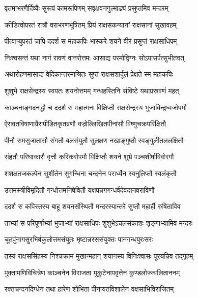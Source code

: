 \twolineshloka
{वृतमाभरणैर्दिव्यैः सुरूपं कामरूपिणम्}
{सवृक्षवनगुल्माढ्यं प्रसुप्तमिव मन्दरम्} %

\twolineshloka
{क्रीडित्वोपरतं रात्रौ वराभरणभूषितम्}
{प्रियं राक्षसकन्यानां राक्षसानां सुखावहम्} %

\twolineshloka
{पीत्वाप्युपरतं चापि ददर्श स महाकपिः}
{भास्करे शयने वीरं प्रसुप्तं राक्षसाधिपम्} %

\twolineshloka
{निःश्वसन्तं यथा नागं रावणं वानरोत्तमः}
{आसाद्य परमोद्विग्नः सोऽपासर्पत्सुभीतवत्} %

\twolineshloka
{अथारोहणमासाद्य वेदिकान्तरमाश्रितः}
{सुप्तं राक्षसशार्दूलं प्रेक्षते स्म महाकपिः} %

\twolineshloka
{शुशुभे राक्षसेन्द्रस्य स्वपतः शयनोत्तमम्}
{गन्धहस्तिनि संविष्टे यथाप्रस्रवणं महत्} %

\twolineshloka
{काञ्चनाङ्गदनद्धौ च ददर्श स महात्मनः}
{विक्षिप्तौ राक्षसेन्द्रस्य भुजाविन्द्रध्वजोपमौ} %

\twolineshloka
{ऐरावतविषाणाग्रैरापीडितकृतव्रणौ}
{वज्रोल्लिखितपीनांसौ विष्णुचक्रपरिक्षितौ} %

\twolineshloka
{पीनौ समसुजातांसौ संगतौ बलसंयुतौ}
{सुलक्षण नखाङ्गुष्ठौ स्वङ्गुलीतललक्षितौ} %

\twolineshloka
{संहतौ परिघाकारौ वृत्तौ करिकरोपमौ}
{विक्षिप्तौ शयने शुभ्रे पञ्चशीर्षाविवोरगौ} %

\twolineshloka
{शशक्षतजकल्पेन सुशीतेन सुगन्धिना}
{चन्दनेन परार्ध्येन स्वनुलिप्तौ स्वलंकृतौ} %

\twolineshloka
{उत्तमस्त्रीविमृदितौ गन्धोत्तमनिषेवितौ}
{यक्षपन्नगगन्धर्वदेवदानवराविणौ} %

\twolineshloka
{ददर्श स कपिस्तस्य बाहू शयनसंस्थितौ}
{मन्दरस्यान्तरे सुप्तौ महार्ही रुषिताविव} %

\twolineshloka
{ताभ्यां स परिपूर्णाभ्यां भुजाभ्यां राक्षसाधिपः}
{शुशुभेऽचलसंकाशः शृङ्गाभ्यामिव मन्दरः} %

\twolineshloka
{चूतपुंनागसुरभिर्बकुलोत्तमसंयुतः}
{मृष्टान्नरससंयुक्तः पानगन्धपुरःसरः} %

\twolineshloka
{तस्य राक्षससिंहस्य निश्चक्राम मुखान्महान्}
{शयानस्य विनिःश्वासः पूरयन्निव तद्गृहम्} %

\twolineshloka
{मुक्तामणिविचित्रेण काञ्चनेन विराजता}
{मुकुटेनापवृत्तेन कुण्डलोज्ज्वलिताननम्} %

\twolineshloka
{रक्तचन्दनदिग्धेन तथा हारेण शोभिता}
{पीनायतविशालेन वक्षसाभिविराजितम्} %


